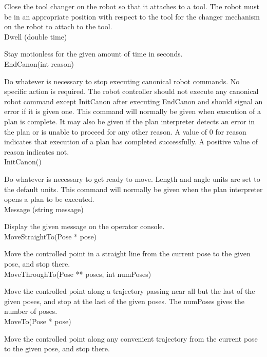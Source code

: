 Close the tool changer on the robot so that it attaches to a tool. The
robot must be in an appropriate position with respect to the tool for
the changer mechanism on the robot to attach to the tool.\\

\sf Dwell (double time)\rm

Stay motionless for the given amount of time in seconds.\\

\sf EndCanon(int reason)\rm

Do whatever is necessary to stop executing canonical robot
commands. No specific action is required. The robot controller should
not execute any canonical robot command except InitCanon after
executing EndCanon and should signal an error if it is given one.
This command will normally be given when execution of a plan is complete.
It may also be given if the plan interpreter detects an error in the
plan or is unable to proceed for any other reason. A value of 0 for
reason indicates that execution of a plan has completed successfully.
A positive value of reason indicates not.\\

\sf InitCanon()\rm

Do whatever is necessary to get ready to move. Length and angle units
are set to the default units. This command will normally be given when
the plan interpreter opens a plan to be executed.\\

\sf Message (string message)\rm

Display the given message on the operator console.\\

\sf MoveStraightTo(Pose * pose)\rm

Move the controlled point in a straight line from the current pose to
the given pose, and stop there.\\

\sf MoveThroughTo(Pose ** poses, int numPoses)\rm

Move the controlled point along a trajectory passing near all but
the last of the given poses, and stop at the last of the given poses.
The numPoses gives the number of poses.\\

\sf MoveTo(Pose * pose)\rm

Move the controlled point along any convenient trajectory from the
current pose to the given pose, and stop there.\\

